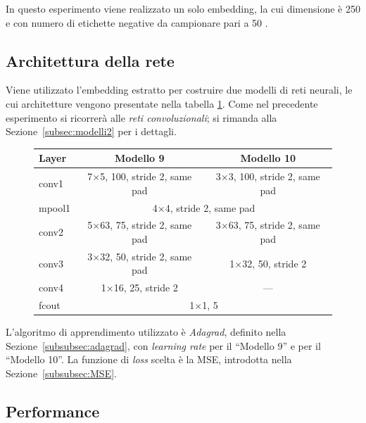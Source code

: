 In questo esperimento viene realizzato un solo embedding, la cui dimensione è {250} e con numero di etichette negative da campionare pari a 50 \cite{liu2016classification}.

\subsection{Architettura della rete}
\label{subsec:modelli3}

Viene utilizzato l'embedding estratto per costruire due modelli di reti neurali, le cui architetture vengono presentate nella tabella \ref{tab:netemb3}.
Come nel precedente esperimento si ricorrerà alle \emph{reti convoluzionali}; si rimanda alla Sezione~\ref{subsec:modelli2} per i dettagli. 

\begin{figure}[H]
	\centering
	\begin{tabular}{lcc}
		\toprule
		\textbf{Layer}& \textbf{Modello 9} & \textbf{Modello 10}	\\ 
		\midrule
		conv1   & {7}$\times${5}, 100, stride 2, same pad    		&{3}$\times${3}, 100, stride 2, same pad 		   \\
		mpool1 	&\multicolumn{2}{c}{{4}$\times${4}, stride 2, same pad}	 \\
		conv2  	&  {5}$\times${63}, 75, stride 2, same pad	    &		{3}$\times${63}, 75, stride 2, same pad    \\
		conv3  	& {3}$\times${32}, 50, stride 2, same pad 	   	&	{1}$\times${32}, 50, stride 2 	   \\
		conv4  	& {1}$\times${16}, 25, stride 2 	   	&	--- 	   \\
		fcout	&\multicolumn{2}{c}{{1}$\times${1}, 5}						\\
		
		\bottomrule	
	\end{tabular}
	\label{tab:netemb3}
\end{figure}

L'algoritmo di apprendimento utilizzato è \emph{Adagrad}, definito nella Sezione~\ref{subsubsec:adagrad}, con \emph{learning rate}  per il ``Modello 9'' e  per il ``Modello 10''. La funzione di \emph{loss} scelta è la MSE, introdotta nella Sezione~\ref{subsubsec:MSE}. 

\subsection{Performance}
\label{subsec:performance3}

